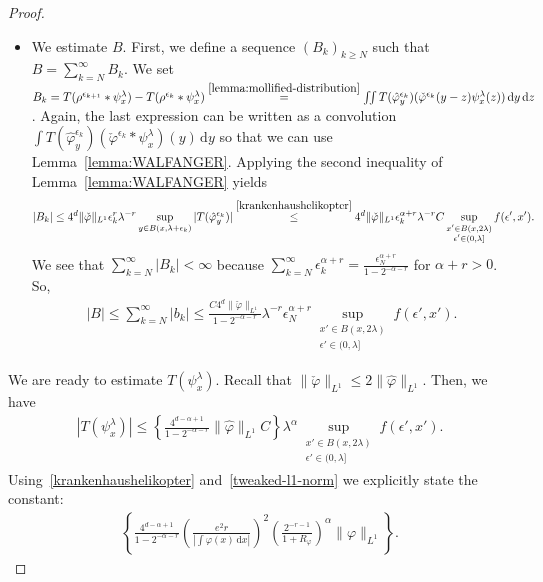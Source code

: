 \begin{proof}
\begin{itemize}
    \item We estimate \( B \). First, we define a sequence \( (B_k)_{k \geq {N}} \) such that \( B = \sum^\infty_{k = N} B_k \). We set \( B_k = T(\rho^{\epsilon_{k+1}} * \psi^\lambda_x) - T (\rho^{\epsilon_k} * \psi^\lambda_x) \overset{\eqref{lemma:mollified-distribution}}{=} \iint T(\hat \varphi^{\epsilon_k}_y) (\check \varphi^{\epsilon_k}(y-z) \psi^\lambda_x(z)) \, \mathrm{d}y \, \mathrm{d}z \). Again, the last expression can be written as a convolution \( \int  T(\hat \varphi^{\epsilon_k}_y) (\check \varphi^{\epsilon_k} * \psi^\lambda_x)(y) \, \mathrm{d}y \) so that we can use Lemma~\ref{lemma:WALFANGER}. Applying the second inequality of Lemma~\ref{lemma:WALFANGER} yields 
    \begin{align*}
      |B_k| \leq 4^d \lVert \check \varphi \rVert_{L^1} \epsilon_k^r \lambda^{-r} \sup_{y \in B(x, \lambda + \epsilon_k)}|T(\hat \varphi^{\epsilon_k}_y)| 
      \overset{\eqref{krankenhaushelikopter}}{\leq}
      4^d \lVert \check \varphi \rVert_{L^1} \epsilon_k^{\alpha + r} \lambda^{-r} C \sup_{\substack{x' \in B(x, 2\lambda)\\ \epsilon' \in (0, \lambda ] }} f(\epsilon', x').
    \end{align*}
    We see that \( \sum^\infty_{k = N} |B_k| < \infty \) because \( \sum^\infty_{k=N} \epsilon_k^{\alpha + r} = \frac{\epsilon_N^{\alpha + r}}{1-2^{-\alpha - r}} \) for \( \alpha + r > 0 \). So, 
    \begin{align*}
      |B| \leq \sum^\infty_{k = N} |b_k| \leq \frac{C 4^d \lVert \check \varphi \rVert_{L^1}}{1-2^{-\alpha -r}}\lambda^{-r} \epsilon_N^{\alpha + r}\sup_{\substack{x' \in B(x, 2\lambda)\\ \epsilon' \in (0, \lambda ] }} f(\epsilon', x').
    \end{align*}
  \end{itemize}

  We are ready to estimate \( T(\psi^\lambda_x) \). Recall that \( \lVert \check \varphi \rVert_{L^1} \leq 2 \lVert \hat \varphi \rVert_{L^1} \). Then, we have
  \begin{align*}
    |T(\psi^\lambda_x)| \leq \left \{\frac{4^{d-\alpha+1}}{1-2^{-\alpha - r}} \lVert \hat \varphi \rVert_{L^1} C \right \}\lambda^\alpha \sup_{\substack{x' \in B(x, 2\lambda)\\ \epsilon' \in (0, \lambda ] }} f(\epsilon', x').
  \end{align*}
  Using~\eqref{krankenhaushelikopter} and~\eqref{tweaked-l1-norm} we explicitly state the constant:
  \begin{align}\label{constant:freiburg}
    \left\{ \frac{4^{d - \alpha + 1}}{1-2^{-\alpha - r}} \left( \frac{e^2r}{|\int \varphi(x) \, \mathrm{d}x|} \right)^2 \left( \frac{2^{-r-1}}{1 + R_\varphi} \right)^\alpha \lVert \varphi \rVert_{L^1} \right\}.
  \end{align}
\end{proof}

